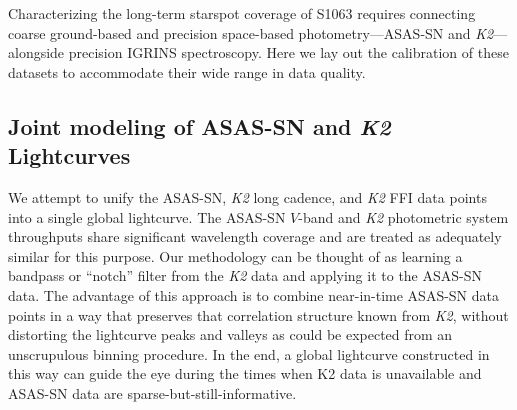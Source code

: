 \documentclass[trackchanges]{aastex631}
\begin{document}

Characterizing the long-term starspot coverage of S1063 requires connecting coarse ground-based and precision space-based photometry---ASAS-SN and \emph{K2}---alongside precision IGRINS spectroscopy.  Here we lay out the calibration of these datasets to accommodate their wide range in data quality.


\subsection{Joint modeling of ASAS-SN and \emph{K2} Lightcurves}

We attempt to unify the ASAS-SN, \emph{K2} long cadence, and \emph{K2} FFI data points into a single global lightcurve.  The ASAS-SN $V$-band and \emph{K2} photometric system throughputs share significant wavelength coverage and are treated as adequately similar for this purpose. Our methodology can be thought of as learning a bandpass or ``notch'' filter from the \emph{K2} data and applying it to the ASAS-SN data.  The advantage of this approach is to combine near-in-time ASAS-SN data points in a way that preserves that correlation structure known from \emph{K2}, without distorting the lightcurve peaks and valleys as could be expected from an unscrupulous binning procedure.  In the end, a global lightcurve constructed in this way can guide the eye during the times when K2 data is unavailable and ASAS-SN data are sparse-but-still-informative.
\end{document}

